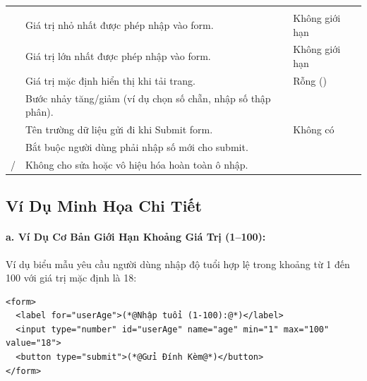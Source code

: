 \begin{prettyTableBox}[Bảng Thuộc Tính Thẻ input type="number" Cần Nắm Vững]
\begin{tabularx}{\linewidth}{K{2.8cm} Z K{2.5cm}}
 &  &  \\
 & Giá trị nhỏ nhất được phép nhập vào form. & Không giới hạn \\
 & Giá trị lớn nhất được phép nhập vào form. & Không giới hạn \\
 & Giá trị mặc định hiển thị khi tải trang. & Rỗng () \\
 & Bước nhảy tăng/giảm (ví dụ  chọn số chẵn,  nhập số thập phân). &  \\
 & Tên trường dữ liệu gửi đi khi Submit form. & Không có \\
 & Bắt buộc người dùng phải nhập số mới cho submit. &  \\
 /  & Không cho sửa hoặc vô hiệu hóa hoàn toàn ô nhập. &  \\
\end{tabularx}
\end{prettyTableBox}

\subsection{Ví Dụ Minh Họa Chi Tiết}

\paragraph{a. Ví Dụ Cơ Bản Giới Hạn Khoảng Giá Trị (1--100):}
Ví dụ biểu mẫu yêu cầu người dùng nhập độ tuổi hợp lệ trong khoảng từ 1 đến 100 với giá trị mặc định là 18:

\begin{codeWindow}
\begin{lstlisting}[language=HTML5]
<form>
  <label for="userAge">(*@Nhập tuổi (1-100):@*)</label>
  <input type="number" id="userAge" name="age" min="1" max="100" value="18">
  <button type="submit">(*@Gửi Đính Kèm@*)</button>
</form>
\end{lstlisting}
\end{codeWindow}

